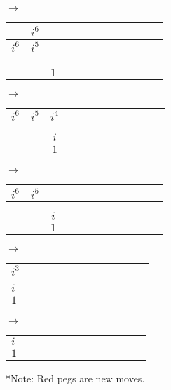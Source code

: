 \documentclass[12pt]{article}
\begin{document}
$\longrightarrow$
\begin{tabular}{|l|c|c|c|c|c|c|c|c|c|c|r|}
    \hline
    \color{red}{$i^7$} & $i^6$ &\\
    \hline
    $i^6$ & $i^5$ & \color{red}{$i^4$}\\
    \hline
    & &\\
    \hline
    & &\\
    \hline
    & & \color{red}{$i$}\\
    \hline
    & & $1$\\
    \hline
\end{tabular}
$\longrightarrow$
\begin{tabular}{|l|c|c|c|c|c|c|c|c|c|c|r|}
    \hline
    & & \color{red}{$i^5$}\\
    \hline
    $i^6$ & $i^5$ & $i^4$\\
    \hline
    & &\\
    \hline
    & &\\
    \hline
    & & $i$\\
    \hline
    & & $1$\\
    \hline
\end{tabular}
$\longrightarrow$
\begin{tabular}{|l|c|c|c|c|c|c|c|c|c|c|r|}
    \hline
    $i^6$ & $i^5$ &\\
    \hline
    & & \color{red}{$i^3$}\\
    \hline
    & &\\
    \hline
    & & $i$\\
    \hline
    & & $1$\\
    \hline
\end{tabular}
$\longrightarrow$
\begin{tabular}{|l|c|c|c|c|c|c|c|c|c|c|r|}
    \hline
    \color{red}{$i^4$}\\
    \hline
    $i^3$\\
    \hline
    \\
    \hline
    $i$\\
    \hline
    $1$\\
    \hline
\end{tabular}
$\longrightarrow$
\begin{tabular}{|l|c|c|c|c|c|c|c|c|c|c|r|}
    \hline
    \color{red}{$i^2$}\\
    \hline
    $i$\\
    \hline
    $1$\\
    \hline
\end{tabular}

*Note: Red pegs are new moves.
\end{document}
